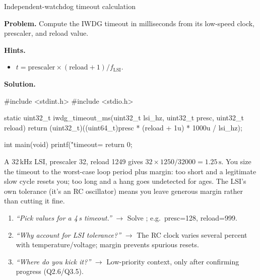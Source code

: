 \begin{gymproblem}{Independent-watchdog timeout calculation}

\textbf{Problem.} Compute the IWDG timeout in milliseconds from its low-speed
clock, prescaler, and reload value.

\textbf{Hints.}
\begin{itemize}
\item $t = \text{prescaler}\times(\text{reload}+1)/f_{\text{LSI}}$.
\end{itemize}

\attempt

\textbf{Solution.}
\begin{cgym}
#include <stdint.h>
#include <stdio.h>

static uint32_t iwdg_timeout_ms(uint32_t lsi_hz, uint32_t presc, uint32_t reload) {
    return (uint32_t)((uint64_t)presc * (reload + 1u) * 1000u / lsi_hz);
}

int main(void) {
    printf("timeout=%
    return 0;
}
\end{cgym}

A 32\,kHz LSI, prescaler 32, reload 1249 gives
$32\times1250/32000 = 1.25\,\text{s}$. You size the timeout to the worst-case
loop period plus margin: too short and a legitimate slow cycle resets you; too
long and a hang goes undetected for ages. The LSI's own tolerance (it's an RC
oscillator) means you leave generous margin rather than cutting it fine.

\followups
\begin{enumerate}
\item \emph{``Pick values for a 4\,s timeout.''} $\rightarrow$ Solve
  ; e.g.\ presc=128, reload=999.
\item \emph{``Why account for LSI tolerance?''} $\rightarrow$ The RC clock
  varies several percent with temperature/voltage; margin prevents spurious
  resets.
\item \emph{``Where do you kick it?''} $\rightarrow$ Low-priority context, only
  after confirming progress (Q2.6/Q3.5).
\end{enumerate}
\end{gymproblem}

